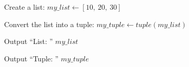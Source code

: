 \begin{algorithm}
\caption{Convert a List into a Tuple}
\begin{algorithmic}[1]

\STATE Create a list:
\STATE $my\_list \gets [10,\ 20,\ 30]$

\STATE Convert the list into a tuple:
\STATE $my\_tuple \gets tuple(my\_list)$

\STATE Output ``List: '' $my\_list$

\STATE Output ``Tuple: '' $my\_tuple$

\end{algorithmic}
\end{algorithm}
